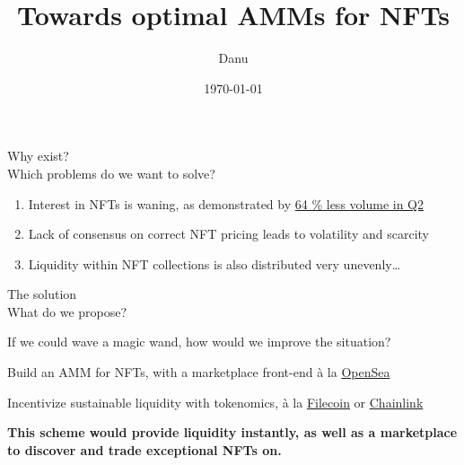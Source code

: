 \documentclass{article}
\title{Towards optimal AMMs for NFTs}
\author{Danu}
\date{\today}
\newcommand{\mbseries}{\fontseries{mb}\selectfont}
\newenvironment{formattedslide}[3][false]{
		\newpage%
		{%
			\parindent 0pt%
			\mbseries%
			#2\\[0.25em]%
			{\large #3}\par%
		}
		\vspace{\fill}
		\color{grayscale-200}
	}{
		\vspace{\fill}
	}
\begin{document}
		\tikzexternaldisable
			\maketitle
			\thispagestyle{empty}
		\tikzexternalenable

		\begin{formattedslide}{Why exist?}{Which problems do we want to solve?}
			\begin{enumerate}
				\item Interest in NFTs is waning, as demonstrated by \href{https://nairametrics.com/2022/07/22/nft-trading-volume-slumps-by-64-in-q2-2022/}{64 \% less volume in Q2}
				\item Lack of consensus on correct NFT pricing leads to volatility and scarcity
				\item Liquidity within NFT collections is also distributed very unevenly\ldots
			\end{enumerate}
		\end{formattedslide}

		

		\begin{formattedslide}{The solution}{What do we propose?}
			If we could wave a magic wand, how would we improve the situation?

			\begin{advantages}
				\item Build an AMM for NFTs, with a marketplace front-end à la \href{https://opensea.io}{OpenSea}
				\item Incentivize sustainable liquidity with tokenomics, à la \href{https://filecoin.io}{Filecoin} or \href{https://chain.link}{Chainlink}
			\end{advantages}

			\textbf{This scheme would provide liquidity instantly, as well as a marketplace to discover and trade exceptional NFTs on.}
		\end{formattedslide}

		
\end{document}
